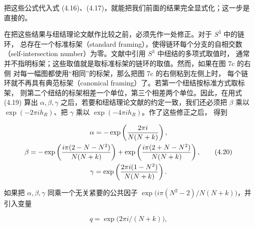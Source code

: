 \documentclass[11pt,a4paper]{article}
\begin{document}
把这些公式代入式 (4.16)、(4.17)，就能把我们前面的结果完全显式化；这一步是直接的。

在把这些结果与纽结理论文献作比较之前，必须先作一处修正。对于 $S^3$ 中的链环，
总存在一个标准标架（standard framing），使得链环每个分支的自相交数
（self-intersection number）为零。文献中引用 $S^3$ 中纽结的多项式取值时，
通常并不指明标架；这些取值就是取标准标架的链环的取值。然而，如果在图 7c 的右侧
对每一幅图都使用“相同”的标架，那么把图 7c 的右侧粘到左侧上时，
每个链环就不再具有典范标架（canonical framing）了。若第一个纽结按标准方式取标架，
则第二个纽结的标架相差一个单位，第三个相差两个单位。因此，在用式 (4.19) 算出
$\alpha,\beta,\gamma$ 之后，若要和纽结理论文献的约定一致，我们还必须把 $\beta$
乘以 $\exp(-2\pi i h_R)$、把 $\gamma$ 乘以 $\exp(-4\pi i h_R)$。作了这些修正之后，
得到

\begin{gather}
    \alpha = -\exp\left(\frac{2\pi i}{N(N+k)}\right), \notag \\
    \beta = -\exp\left(\frac{i\pi(2-N-N^2)}{N(N+k)}\right)
            +\exp\left(\frac{i\pi(2+N-N^2)}{N(N+k)}\right), \tag{4.20} \\
    \gamma = \exp\left(\frac{2\pi i(1-N^2)}{N(N+k)}\right). \notag
\end{gather}


如果把 $\alpha,\beta,\gamma$ 同乘一个无关紧要的公共因子
$\exp\bigl(i\pi(N^2-2)/N(N+k)\bigr)$，并引入变量

\begin{equation}
    q = \exp\bigl(2\pi i/(N+k)\bigr), \tag{4.21}
\end{equation}
\end{document}
